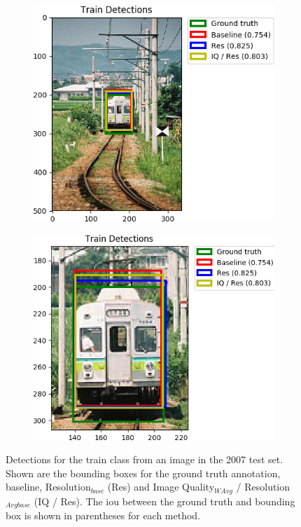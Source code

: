 \begin{figure}[H]
    \centering
    \begin{subfigure}[b]{0.45\textwidth}
        \center
        \includegraphics[width=\textwidth]{Figs/Results/000002_res.png}
        \caption{}\label{fig:}
    \end{subfigure}
    \begin{subfigure}[b]{0.45\textwidth}
        \center
        \includegraphics[width=\textwidth]{Figs/Results/000002_reszoom.png}
        \caption{}\label{fig:}
    \end{subfigure}
    \caption{Detections for the train class from an image in the 2007 test set. Shown are the bounding boxes for the ground truth annotation, baseline, Resolution$_{base}$ (Res) and Image Quality$_{WAvg}$ / Resolution$_{Avgbase}$ (IQ / Res). The \gls{iou} between the ground truth and bounding box is shown in parentheses for each method.}
    \label{fig:trainres}
\end{figure} 





